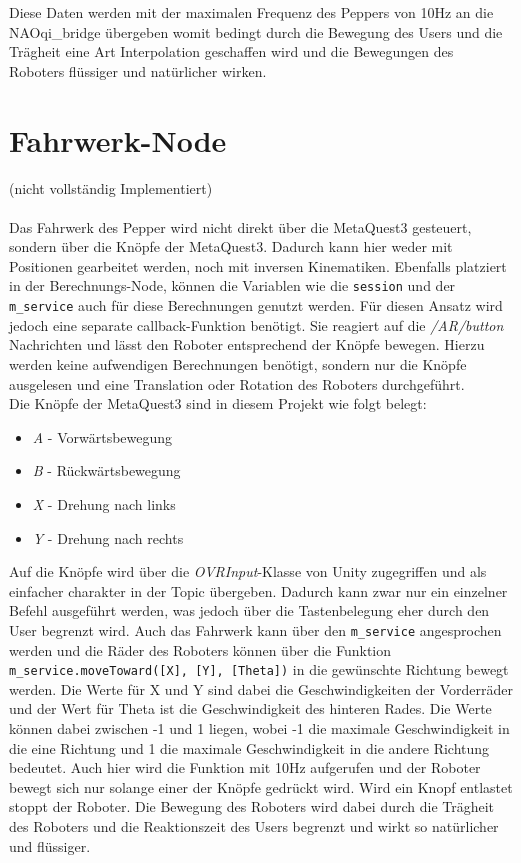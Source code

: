 Diese Daten werden mit der maximalen Frequenz des Peppers von 10Hz an die NAOqi\_bridge übergeben womit bedingt durch die Bewegung des Users und die Trägheit eine Art Interpolation geschaffen wird und die Bewegungen des Roboters flüssiger und natürlicher wirken.\\

\section{Fahrwerk-Node}\label{sec:Fahrwerk-Node}
(nicht vollständig Implementiert)\\\\
Das Fahrwerk des Pepper wird nicht direkt über die MetaQuest3 gesteuert, sondern über die Knöpfe der MetaQuest3. Dadurch kann hier weder mit Positionen gearbeitet werden, noch mit inversen Kinematiken. Ebenfalls platziert in der Berechnungs-Node, können die Variablen wie die \texttt{session} und der \texttt{m\_service} auch für diese Berechnungen genutzt werden. Für diesen Ansatz wird jedoch eine separate callback-Funktion benötigt. Sie reagiert auf die \textit{/AR/button} Nachrichten und lässt den Roboter entsprechend der Knöpfe bewegen. Hierzu werden keine aufwendigen Berechnungen benötigt, sondern nur die Knöpfe ausgelesen und eine Translation oder Rotation des Roboters durchgeführt.\\
Die Knöpfe der MetaQuest3 sind in diesem Projekt wie folgt belegt:
\begin{itemize}
    \item \textit{A} - Vorwärtsbewegung
    \item \textit{B} - Rückwärtsbewegung
    \item \textit{X} - Drehung nach links
    \item \textit{Y} - Drehung nach rechts
\end{itemize}
Auf die Knöpfe wird über die \textit{OVRInput}-Klasse von Unity zugegriffen und als einfacher charakter in der Topic übergeben. Dadurch kann zwar nur ein einzelner Befehl ausgeführt werden, was jedoch über die Tastenbelegung eher durch den User begrenzt wird. Auch das Fahrwerk kann über den \texttt{m\_service} angesprochen werden und die Räder des Roboters können über die Funktion \texttt{m\_service.moveToward([X], [Y], [Theta])} in die gewünschte Richtung bewegt werden. Die Werte für X und Y sind dabei die Geschwindigkeiten der Vorderräder und der Wert für Theta ist die Geschwindigkeit des hinteren Rades. Die Werte können dabei zwischen -1 und 1 liegen, wobei -1 die maximale Geschwindigkeit in die eine Richtung und 1 die maximale Geschwindigkeit in die andere Richtung bedeutet. Auch hier wird die Funktion mit 10Hz aufgerufen und der Roboter bewegt sich nur solange einer der Knöpfe gedrückt wird. Wird ein Knopf entlastet stoppt der Roboter. Die Bewegung des Roboters wird dabei durch die Trägheit des Roboters und die Reaktionszeit des Users begrenzt und wirkt so natürlicher und flüssiger.\\
